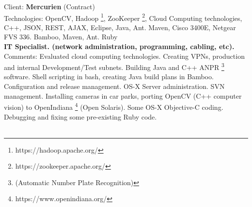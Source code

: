 \documentclass{article}
\let\svthefootnote\thefootnote
\newcommand\Cfootnote[2][black]{\def\thefootnote{\color{#1}\svthefootnote}%
  \footnote{\color{#1}#2}}
\begin{document}
%
%
%
%
%


Client: 	\textbf  {Mercurien } (Contract) \\
Technologies: 	OpenCV, Hadoop\Cfootnote[blue]{https://hadoop.apache.org/}, ZooKeeper\Cfootnote[blue]{https://zookeeper.apache.org/}, Cloud Computing technologies, C++, JSON, REST, AJAX, Eclipse, Java, Ant. Maven, Cisco 3400E, Netgear FVS 336.  Bamboo, Maven, Ant. Ruby \\
\textbf{ IT Specialist. (network administration, programming, cabling, etc). } \\
Comments:	Evaluated cloud computing technologies. Creating VPNs, production 
		and internal Development/Test subnets. Building Java and C++ 
ANPR \footnote{(Automatic Number Plate Recognition)} software. Shell scripting in bash, creating Java build plans in Bamboo. Configuration and release management. OS-X Server administration. SVN management.  Installing cameras in car parks, porting OpenCV (C++ computer vision) to OpenIndiana\Cfootnote[blue]{https://www.openindiana.org/} (Open Solaris). Some OS-X Objective-C coding. Debugging and fixing some pre-existing Ruby code. \\
\\
\end{document}
